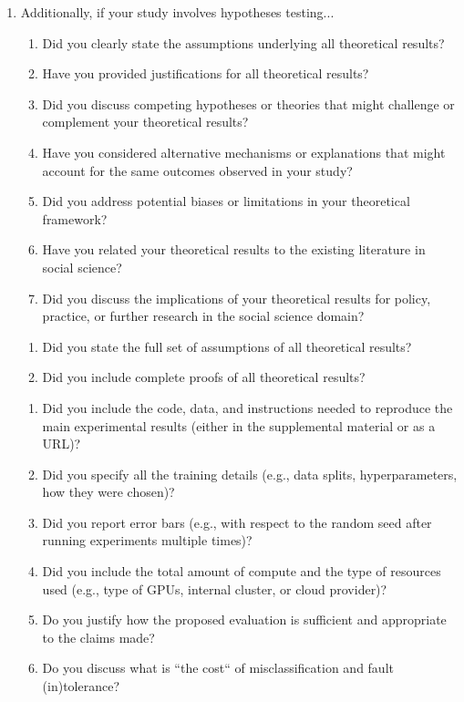 \begin{enumerate}
\item Additionally, if your study involves hypotheses testing...
\begin{enumerate}
  \item Did you clearly state the assumptions underlying all theoretical results?
  \item Have you provided justifications for all theoretical results?
  \item Did you discuss competing hypotheses or theories that might challenge or complement your theoretical results?
  \item Have you considered alternative mechanisms or explanations that might account for the same outcomes observed in your study?
  \item Did you address potential biases or limitations in your theoretical framework?
  \item Have you related your theoretical results to the existing literature in social science?
  \item Did you discuss the implications of your theoretical results for policy, practice, or further research in the social science domain?
\end{enumerate}

\begin{enumerate}
  \item Did you state the full set of assumptions of all theoretical results?
	\item Did you include complete proofs of all theoretical results?
\end{enumerate}

\begin{enumerate}
  \item Did you include the code, data, and instructions needed to reproduce the main experimental results (either in the supplemental material or as a URL)?
  \item Did you specify all the training details (e.g., data splits, hyperparameters, how they were chosen)?
     \item Did you report error bars (e.g., with respect to the random seed after running experiments multiple times)?
	\item Did you include the total amount of compute and the type of resources used (e.g., type of GPUs, internal cluster, or cloud provider)?
     \item Do you justify how the proposed evaluation is sufficient and appropriate to the claims made? 
     \item Do you discuss what is ``the cost`` of misclassification and fault (in)tolerance?
\end{enumerate}


\end{enumerate}
